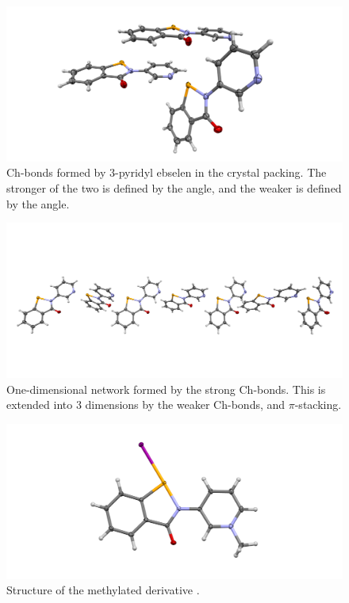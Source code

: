 \begin{figure}
    \centering
    \includegraphics[width=\linewidth]{Figures/3py-ebs-chbonds.png}
    \caption{Ch-bonds formed by 3-pyridyl ebselen  in the crystal packing. The stronger of the two is defined by the  angle, and the weaker is defined by the  angle.}
    \label{fig:3py-ebs-chbonds}
\end{figure}

\begin{figure}
    \centering
    \includegraphics[width=\linewidth]{Figures/3py-ebs-chain.png}
    \caption{One-dimensional network formed by the strong  Ch-bonds. This is extended into 3 dimensions by the weaker  Ch-bonds, and $\pi$-stacking.}
    \label{fig:3py-ebs-chain}
\end{figure}

\begin{figure}
    \centering
    \includegraphics[width=0.6\linewidth]{Figures/3py-ebs-mei.png}
    \caption{Structure of the methylated derivative .}
    \label{fig:3py-ebs-mei}
\end{figure}

